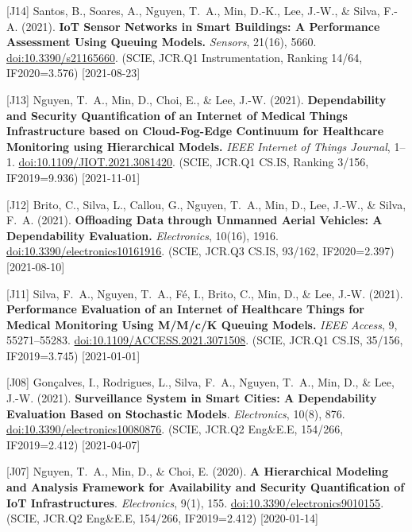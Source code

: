 {\begin{pubenumerate}
\item {\color{blue}[J14]} Santos, B., Soares, A., Nguyen, T.\ A., Min, D.-K., Lee, J.-W., \& Silva, F.-A. (2021). \textbf{IoT Sensor Networks in Smart Buildings: A Performance Assessment Using Queuing Models.} \textit{Sensors}, 21(16), 5660. \href{https://doi.org/10.3390/s21165660}{doi:10.3390/s21165660}. (SCIE, JCR.Q1 Instrumentation, Ranking 14/64, IF2020=3.576) [2021-08-23]

\item {\color{blue}[J13]} Nguyen, T.\ A., Min, D., Choi, E., \& Lee, J.-W. (2021). \textbf{Dependability and Security Quantification of an Internet of Medical Things Infrastructure based on Cloud-Fog-Edge Continuum for Healthcare Monitoring using Hierarchical Models.} \textit{IEEE Internet of Things Journal}, 1--1. \href{https://ieeexplore.ieee.org/document/9434376}{doi:10.1109/JIOT.2021.3081420}. (SCIE, JCR.Q1 CS.IS, Ranking 3/156, IF2019=9.936) [2021-11-01]

\item {\color{blue}[J12]} Brito, C., Silva, L., Callou, G., Nguyen, T.\ A., Min, D., Lee, J.-W., \& Silva, F.\ A. (2021). \textbf{Offloading Data through Unmanned Aerial Vehicles: A Dependability Evaluation.} \textit{Electronics}, 10(16), 1916. \href{https://doi.org/10.3390/electronics10161916}{doi:10.3390/electronics10161916}. (SCIE, JCR.Q3 CS.IS, 93/162, IF2020=2.397) [2021-08-10]

\item {\color{blue}[J11]} Silva, F.\ A., Nguyen, T.\ A., F\'e, I., Brito, C., Min, D., \& Lee, J.-W. (2021). \textbf{Performance Evaluation of an Internet of Healthcare Things for Medical Monitoring Using M/M/c/K Queuing Models.} \textit{IEEE Access}, 9, 55271--55283. \href{https://ieeexplore.ieee.org/document/9398691}{doi:10.1109/ACCESS.2021.3071508}. (SCIE, JCR.Q1 CS.IS, 35/156, IF2019=3.745) [2021-01-01]

\item {\color{blue}[J08]} Gon\c{c}alves, I., Rodrigues, L., Silva, F.\ A., Nguyen, T.\ A., Min, D., \& Lee, J.-W. (2021). \textbf{Surveillance System in Smart Cities: A Dependability Evaluation Based on Stochastic Models}. \textit{Electronics}, 10(8), 876. \href{https://www.mdpi.com/2079-9292/10/8/876}{doi:10.3390/electronics10080876}. (SCIE, JCR.Q2 Eng\&E.E, 154/266, IF2019=2.412) [2021-04-07]

\item {\color{blue}[J07]} Nguyen, T.\ A., Min, D., \& Choi, E. (2020). \textbf{A Hierarchical Modeling and Analysis Framework for Availability and Security Quantification of IoT Infrastructures}. \textit{Electronics}, 9(1), 155. \href{https://doi.org/10.3390/electronics9010155}{doi:10.3390/electronics9010155}. (SCIE, JCR.Q2 Eng\&E.E, 154/266, IF2019=2.412) [2020-01-14]


\end{pubenumerate}}
